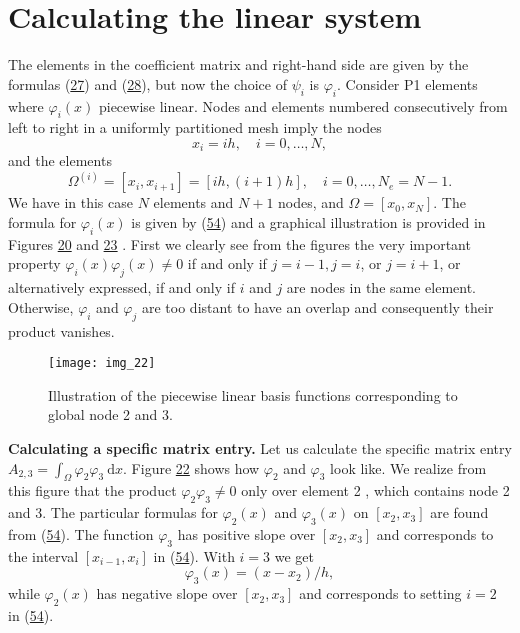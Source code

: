 \documentclass[../main.tex]{subfiles}
\begin{document}
	\section[Calculating the linear system]{Calculating the linear system}
	\label{sec:sec_3_6}
	The elements in the coefficient matrix and right-hand side are given by the formulas (\hyperref[eqa27]{27}) and (\hyperref[eqa28]{28}), but now the choice of $\psi_{i}$ is $\varphi_{i}$. Consider P1 elements where $\varphi_{i}(x)$ piecewise linear. Nodes and elements numbered consecutively from left to right in a uniformly partitioned mesh imply the nodes
	$$
	x_{i}=i h, \quad i=0, \ldots, N,
	$$
	and the elements
	\begin{equation}\label{eqa55}
		\Omega^{(i)}=\left[x_{i}, x_{i+1}\right]=[i h,(i+1) h], \quad i=0, \ldots, N_{e}=N-1.
	\end{equation}
	We have in this case $N$ elements and $N+1$ nodes, and $\Omega=\left[x_{0}, x_{N}\right]$. The formula for $\varphi_{i}(x)$ is given by (\hyperref[eqa54]{54}) and a graphical illustration is provided in Figures \hyperref[fig:img_20]{20} and \hyperref[fig:img_23]{23} . First we clearly see from the figures the very important property $\varphi_{i}(x) \varphi_{j}(x) \neq 0$ if and only if $j=i-1, j=i$, or $j=i+1$, or alternatively expressed, if and only if $i$ and $j$ are nodes in the same element. Otherwise, $\varphi_{i}$ and $\varphi_{j}$ are too distant to have an overlap and consequently their product vanishes.
	\begin{figure}[H]
		\centering
		\texttt{[image: img\_22]}
		\caption{Illustration of the piecewise linear basis functions corresponding to
			global node 2 and 3.}
		\label{fig:img_22}
	\end{figure}
	
	\noindent \textbf{Calculating a specific matrix entry.} Let us calculate the specific matrix entry $A_{2,3}=\int_{\Omega} \varphi_{2} \varphi_{3} \mathrm{~d} x$. Figure \hyperref[fig:img_22]{22} shows how $\varphi_{2}$ and $\varphi_{3}$ look like. We realize from this figure that the product $\varphi_{2} \varphi_{3} \neq 0$ only over element 2 , which contains node 2 and 3. The particular formulas for $\varphi_{2}(x)$ and $\varphi_{3}(x)$ on $\left[x_{2}, x_{3}\right]$ are found from (\hyperref[eqa54]{54}). The function $\varphi_{3}$ has positive slope over $\left[x_{2}, x_{3}\right]$ and corresponds to the interval $\left[x_{i-1}, x_{i}\right]$ in (\hyperref[eqa54]{54}). With $i=3$ we get
	$$
	\varphi_{3}(x)=\left(x-x_{2}\right) / h,
	$$
	while $\varphi_{2}(x)$ has negative slope over $\left[x_{2}, x_{3}\right]$ and corresponds to setting $i=2$ in (\hyperref[eqa54]{54}).
	
\end{document}
